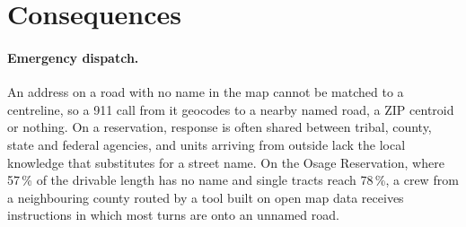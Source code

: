 \documentclass[11pt]{article}
\begin{document}
\begin{table}[htbp]
\centering
\small
\caption{Reservation tracts with the most unnamed drivable road. Local:
unnamed share of local street length. Burned: share of land burned
2015 to 2023 (MTBS). SVI: CDC SVI 2022 overall percentile \cite{svi}.}
\label{tab:tracts}
\end{table}

\section{Consequences}

\paragraph{Emergency dispatch.} An address on a road with no name in the map
cannot be matched to a centreline, so a 911 call from it geocodes to a
nearby named road, a ZIP centroid or nothing. On a reservation, response is
often shared between tribal, county, state and federal agencies, and units
arriving from outside lack the local knowledge that substitutes for a street
name. On the Osage Reservation, where 57\,\% of the drivable length has no
name and single tracts reach 78\,\%, a crew from a neighbouring county
routed by a tool built on open map data receives instructions in which most
turns are onto an unnamed road.
\end{document}
